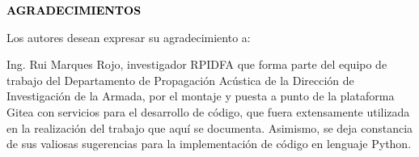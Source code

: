 
\begin{center}
	\Large\textbf{{\textcolor{black}{AGRADECIMIENTOS}}}
\end{center}Los autores desean expresar su agradecimiento a:

\vspace{2pc}

\begin{minipage}[c]{0.2\linewidth}
\end{minipage}
\hfill
\begin{minipage}[c]{0.7\linewidth}
	Ing. Rui Marques Rojo, investigador RPIDFA que forma parte del equipo de trabajo del Departamento de Propagación Acústica de la Dirección de Investigación de la Armada, por el montaje y puesta a punto de la plataforma Gitea con servicios para el desarrollo de código, que fuera extensamente utilizada en la realización del trabajo que aquí se documenta.  Asimismo, se deja constancia de sus valiosas sugerencias para la implementación de código en lenguaje Python.
\end{minipage}%

\vspace{2pc}
\clearpage
